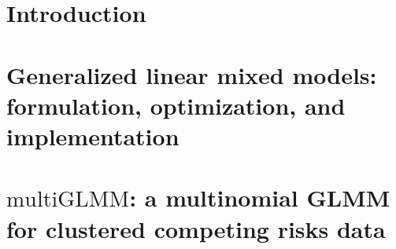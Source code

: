 \documentclass[12pt, %
               openright, %
               oneside, %
               a4paper, %
               chapter=TITLE, %
               section=TITLE, %
               brazil,
               english %
]{abntex2}
\begin{document}
\listofalgorithms
\cleardoublepage
\makeatletter
\def\numberline#1{\hb@xt@\@tempdima{#1\hfil}}
\makeatother
\tableofcontents*
\cleardoublepage
\textual
\chapter{Introduction}
\label{cap:intro}

\chapter{Generalized linear mixed models: formulation, optimization, and
  implementation}
\label{cap:methods}

\chapter{\(\text{multiGLMM}\): a multinomial GLMM for clustered
  competing risks data}
\label{cap:model}

\end{document}
